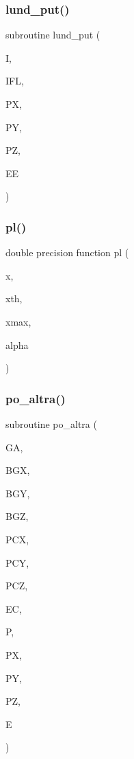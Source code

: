\mbox{\label{sophia_8f_a0d3735098c482b58d34ec7c94184d48c}} 
\subsubsection{\texorpdfstring{lund\+\_\+put()}{lund\_put()}}
{\footnotesize\ttfamily subroutine lund\+\_\+put (\begin{DoxyParamCaption}\item[{}]{I,  }\item[{}]{I\+FL,  }\item[{}]{PX,  }\item[{}]{PY,  }\item[{}]{PZ,  }\item[{}]{EE }\end{DoxyParamCaption})}

\mbox{\label{sophia_8f_a6c34da18942ed8ac849df1d06a2b9c6c}} 
\subsubsection{\texorpdfstring{pl()}{pl()}}
{\footnotesize\ttfamily double precision function pl (\begin{DoxyParamCaption}\item[{}]{x,  }\item[{}]{xth,  }\item[{}]{xmax,  }\item[{}]{alpha }\end{DoxyParamCaption})}

\mbox{\label{sophia_8f_a17bed582d215cdca12ce6acc9110151e}} 
\subsubsection{\texorpdfstring{po\+\_\+altra()}{po\_altra()}}
{\footnotesize\ttfamily subroutine po\+\_\+altra (\begin{DoxyParamCaption}\item[{}]{GA,  }\item[{}]{B\+GX,  }\item[{}]{B\+GY,  }\item[{}]{B\+GZ,  }\item[{}]{P\+CX,  }\item[{}]{P\+CY,  }\item[{}]{P\+CZ,  }\item[{}]{EC,  }\item[{}]{P,  }\item[{}]{PX,  }\item[{}]{PY,  }\item[{}]{PZ,  }\item[{}]{E }\end{DoxyParamCaption})}

